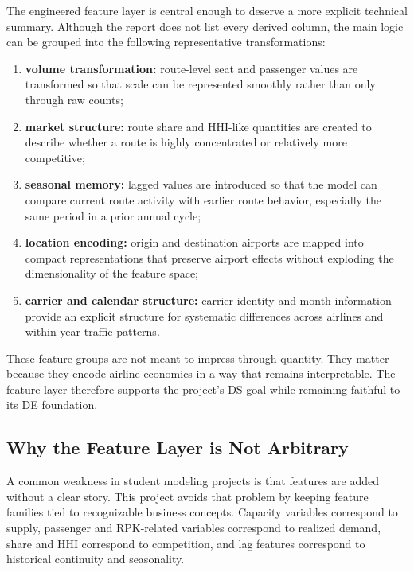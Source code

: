 \documentclass[11pt,a4paper]{article}
\begin{document}
The engineered feature layer is central enough to deserve a more explicit
technical summary. Although the report does not list every derived column, the
main logic can be grouped into the following representative transformations:

\begin{enumerate}[leftmargin=*, label=(\arabic*)]
  \item \textbf{volume transformation:} route-level seat and passenger values
  are transformed so that scale can be represented smoothly rather than only
  through raw counts;
  \item \textbf{market structure:} route share and HHI-like quantities are
  created to describe whether a route is highly concentrated or relatively more
  competitive;
  \item \textbf{seasonal memory:} lagged values are introduced so that the
  model can compare current route activity with earlier route behavior,
  especially the same period in a prior annual cycle;
  \item \textbf{location encoding:} origin and destination airports are mapped
  into compact representations that preserve airport effects without exploding
  the dimensionality of the feature space;
  \item \textbf{carrier and calendar structure:} carrier identity and month
  information provide an explicit structure for systematic differences across
  airlines and within-year traffic patterns.
\end{enumerate}

These feature groups are not meant to impress through quantity. They matter
because they encode airline economics in a way that remains interpretable. The
feature layer therefore supports the project’s DS goal while remaining faithful
to its DE foundation.

\subsection{Why the Feature Layer is Not Arbitrary}

A common weakness in student modeling projects is that features are added
without a clear story. This project avoids that problem by keeping feature
families tied to recognizable business concepts. Capacity variables correspond
to supply, passenger and RPK-related variables correspond to realized demand,
share and HHI correspond to competition, and lag features correspond to
historical continuity and seasonality.
\end{document}
